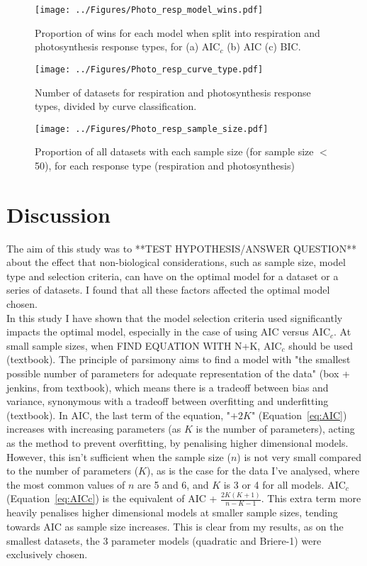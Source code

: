 \documentclass[11pt]{article}
\begin{document}
\begin{figure} [H]
	\texttt{[image: ../Figures/Photo\_resp\_model\_wins.pdf]}
	\caption{\label{fig:photo_resp_model} Proportion of wins for each model when split into respiration and photosynthesis response types, for (a) AIC$_c$ (b) AIC (c) BIC.}
\end{figure}

\begin{figure} [H]
	\texttt{[image: ../Figures/Photo\_resp\_curve\_type.pdf]}
	\caption{\label{fig:photo_resp_curve_type} Number of datasets for respiration and photosynthesis response types, divided by curve classification.}
\end{figure}

\begin{figure} [H]
	\texttt{[image: ../Figures/Photo\_resp\_sample\_size.pdf]}
	\caption{\label{fig:photo_resp_ss} Proportion of all datasets with each sample size (for sample size $<$ 50), for each response type (respiration and photosynthesis)}
\end{figure}


\section{Discussion}

The aim of this study was to **TEST HYPOTHESIS/ANSWER QUESTION** about the effect that non-biological considerations, such as sample size, model type and selection criteria, can have on the optimal model for a dataset or a series of datasets. I found that all these factors affected the optimal model chosen.
\\

In this study I have shown that the model selection criteria used significantly impacts the optimal model, especially in the case of using AIC versus AIC$_c$. At small sample sizes, when FIND EQUATION WITH N+K, AIC$_c$ should be used (textbook). The principle of parsimony aims to find a model with "the smallest possible number of parameters for adequate representation of the data" (box + jenkins, from textbook), which means there is a tradeoff between bias and variance, synonymous with a tradeoff between overfitting and underfitting (textbook). In AIC, the last term of the equation, "$+2K$" (Equation~\ref{eq:AIC}) increases with increasing parameters (as $K$ is the number of parameters), acting as the method to prevent overfitting, by penalising higher dimensional models. However, this isn't sufficient when the sample size ($n$) is not very small compared to the number of parameters ($K$), as is the case for the data I've analysed, where the most common values of $n$ are 5 and 6, and $K$ is 3 or 4 for all models. AIC$_c$ (Equation~\ref{eq:AICc}) is the equivalent of AIC + $\frac{2K(K+1)}{n-K-1}$. This extra term more heavily penalises higher dimensional models at smaller sample sizes, tending towards AIC as sample size increases. This is clear from my results, as on the smallest datasets, the 3 parameter models (quadratic and Briere-1) were exclusively chosen.
\\
\end{document}
